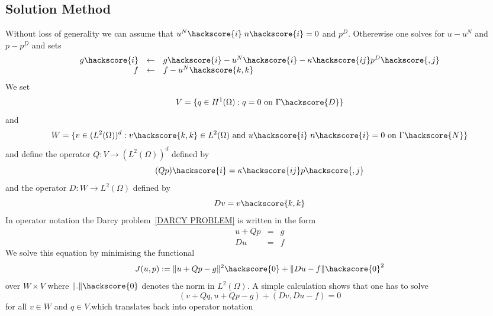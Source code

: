 \subsection{Solution Method \label{DARCY SOLVE}}
Without loss of generality we can assume that $u^{N}\hackscore{i}  \; n\hackscore{i}=0$ and 
$p^{D}$. Otherewise one solves for $u-u^{N}$ and $p-p^{D}$ and sets 
\begin{equation}
\begin{array}{rcl}
g\hackscore{i} & \leftarrow & g\hackscore{i} - u^{N}\hackscore{i} -  \kappa\hackscore{ij} p^{D}\hackscore{,j }\\
f & \leftarrow & f - u^{N}\hackscore{k,k}
\end{array}
\end{equation} 
We set 
\begin{equation}
V = \{ q \in H^{1}(\Omega) : q=0 \mbox{ on } \Gamma\hackscore{D} \}
\end{equation}
and 
\begin{equation}
W = \{ v \in (L^2(\Omega))^{d} : v\hackscore{k,k} \in L^2(\Omega) \mbox{ and } u\hackscore{i} \; n\hackscore{i} =0  \mbox{ on } \Gamma\hackscore{N} \}
\end{equation}
and define the operator $Q: V \rightarrow (L^2(\Omega))^{d}$ defined by
\begin{equation}
(Qp)\hackscore{i} = \kappa\hackscore{ij} p\hackscore{,j}
\end{equation}
and the operator $D: W \rightarrow L^2(\Omega)$ defined by 
\begin{equation}
Dv = v\hackscore{k,k}
\end{equation}
In operator notation the Darcy problem~\ref{DARCY PROBLEM} is written in the form
\begin{equation}
\begin{array}{rcl}
u + Qp & = & g \\
Du & = & f 
\end{array}
\end{equation} 
We solve this equation by minimising the functional
\begin{equation}
J(u,p):=\|u + Qp - g\|^2\hackscore{0} + \|Du-f\|\hackscore{0}^2 
\end{equation} 
over $W \times V$ where $\|.\|\hackscore{0}$ denotes the norm in $L^2(\Omega)$. A simple calculation shows that
one has to solve
\begin{equation}
( v + Qq , u + Qp - g) + (Dv,Du-f) =0 
\end{equation} 
for all $v\in W$ and $q \in V$.which translates back into operator notation
